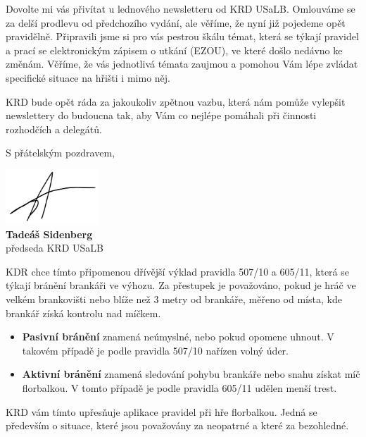 \documentclass{newsletter_2025}
\begin{document}
\kdrtoc
\pagebreak
{}
Dovolte mi vás přivítat u lednového newsletteru od KRD USaLB. Omlouváme se za delší prodlevu od předchozího vydání, ale  věříme, že nyní již pojedeme opět pravidělně. Připravili jsme si pro vás pestrou škálu témat, která se týkají pravidel a prací se elektronickým zápisem o utkání (EZOU), ve které došlo nedávno ke změnám. Věříme, že vás jednotlivá témata zaujmou a pomohou Vám lépe zvládat specifické situace na hřišti i mimo něj.

KRD bude opět ráda za jakoukoliv zpětnou vazbu, která nám pomůže vylepšit newslettery do budoucna tak, aby Vám co nejlépe pomáhali při činnosti rozhodčích a delegátů.

S přátelským pozdravem,

\begin{flushleft}
	\vspace{3\baselineskip}
	\includegraphics[width=3.5cm, keepaspectratio]{tadeas_sidenberg_podpis}\\
	\textbf{Tadeáš Sidenberg}\\
	předseda KRD USaLB
\end{flushleft}

\pagebreak
{}

KDR chce tímto připomenou dřívější výklad pravidla 507/10 a 605/11, která se týkají bránění brankáři ve výhozu. Za přestupek je považováno, pokud je hráč ve velkém brankovišti nebo blíže než 3 metry od brankáře, měřeno od místa, kde brankář získá kontrolu nad míčkem.

\begin{itemize}
	\item \textbf{Pasivní bránění} znamená neúmyslné, nebo pokud opomene uhnout. V takovém případě je podle pravidla 507/10 nařízen volný úder.
	\item \textbf{Aktivní bránění} znamená sledování pohybu brankáře nebo snahu získat míč florbalkou. V tomto případě je podle pravidla 605/11 udělen menší trest.
\end{itemize}

KRD vám tímto upřesňuje aplikace pravidel při hře florbalkou. Jedná se především o situace, které jsou považovány za neopatrné a které za bezohledné.
\end{document}
